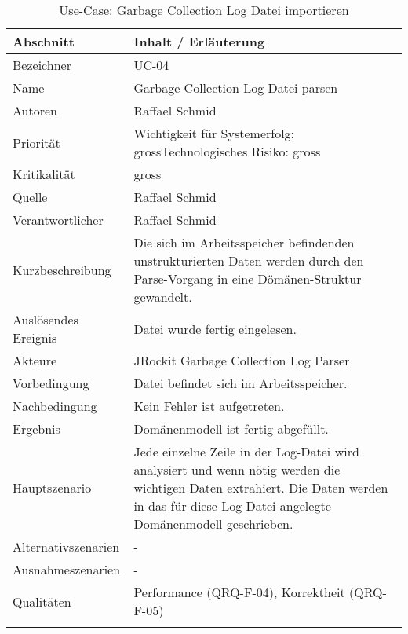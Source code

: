 \begin{longtable}{|p{4cm}|p{10.5cm}|}
\hline
   \textbf{Abschnitt} & \textbf{Inhalt / Erläuterung} \\\hline
   Bezeichner & UC-04\\\hline
   Name & Garbage Collection Log Datei parsen\\\hline
   Autoren & Raffael Schmid\\\hline
   Priorität & Wichtigkeit für Systemerfolg: gross\newline Technologisches Risiko: gross\\\hline
   Kritikalität & gross\\\hline
   Quelle & Raffael Schmid\\\hline
   Verantwortlicher & Raffael Schmid\\\hline
   Kurzbeschreibung & Die sich im Arbeitsspeicher befindenden unstrukturierten Daten werden durch den Parse-Vorgang in eine Dömänen-Struktur gewandelt. \\\hline
   Auslösendes Ereignis & Datei wurde fertig eingelesen.\\\hline
   Akteure & JRockit Garbage Collection Log Parser\\\hline
   Vorbedingung & Datei befindet sich im Arbeitsspeicher.\\\hline
   Nachbedingung & Kein Fehler ist aufgetreten.\\\hline
   Ergebnis & Domänenmodell ist fertig abgefüllt. \\\hline
   Hauptszenario & Jede einzelne Zeile in der Log-Datei wird analysiert und wenn nötig werden die wichtigen Daten extrahiert. Die Daten werden in das für diese Log Datei angelegte Domänenmodell geschrieben.
	\\\hline
   Alternativszenarien & -\\\hline
   Ausnahmeszenarien & -\\\hline
   Qualitäten & Performance (QRQ-F-04), Korrektheit (QRQ-F-05)\\\hline
\caption{Use-Case: Garbage Collection Log Datei importieren}
\end{longtable}

